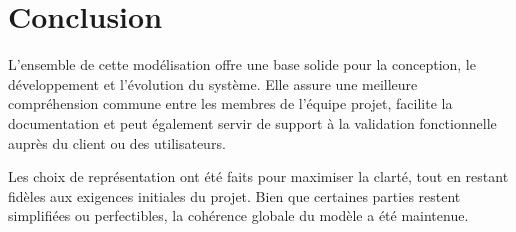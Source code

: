 \documentclass{article}
\begin{document}
\section{Conclusion}

L’ensemble de cette modélisation offre une base solide pour la conception, le développement et l’évolution du système. Elle assure une meilleure compréhension commune entre les membres de l'équipe projet, facilite la documentation et peut également servir de support à la validation fonctionnelle auprès du client ou des utilisateurs.

Les choix de représentation ont été faits pour maximiser la clarté, tout en restant fidèles aux exigences initiales du projet. Bien que certaines parties restent simplifiées ou perfectibles, la cohérence globale du modèle a été maintenue.
\end{document}
